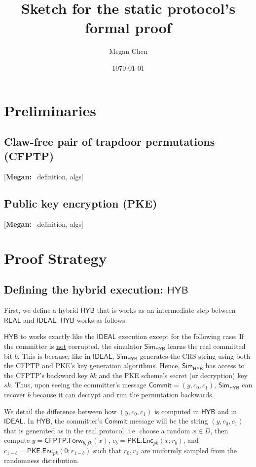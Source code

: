 \documentclass{article}[12pt]
\title{Sketch for the \cite{CanettiF01} static protocol's formal proof}
\author{Megan Chen}
\date{\today}
\newcommand{\authnote}[2]{[{\color{red}\textbf{#1:}}~{\color{blue} #2}]}
\newcommand{\authnote}[2]{}
\newcommand{\megan}[1]{\authnote{Megan}{#1}}
\newcommand{\CommitMsg}{\mathsf{Commit}}
\newcommand{\PKE}{\mathsf{PKE}}
\newcommand{\Enc}{\mathsf{Enc}}
\newcommand{\EncKey}{{pk}}
\newcommand{\DecKey}{{sk}}
\newcommand{\CFPTP}{\mathsf{CFPTP}}
\newcommand{\Forw}{\mathsf{Forw}}
\newcommand{\ForwKey}{{fk}}
\newcommand{\BackKey}{{bk}}
\newcommand{\Simulator}{{\mathsf{Sim}}} %
\newcommand{\Ideal}{{\mathsf{IDEAL}}}
\newcommand{\Hyb}{{\mathsf{HYB}}}
\newcommand{\Real}{{\mathsf{REAL}}}
\begin{document}
\maketitle
\tableofcontents

\section{Preliminaries}

\subsection{Claw-free pair of trapdoor permutations (CFPTP)}
\megan{definition, algs}

\subsection{Public key encryption (PKE)}
\megan{definition, algs}

\section{Proof Strategy}

\subsection{Defining the hybrid execution: $\Hyb$}
First, we define a hybrid $\Hyb$ that is works as an intermediate step between $\Real$ and $\Ideal$. $\Hyb$ works as follows:

$\Hyb$ to works exactly like the $\Ideal$ execution except for the following case: If the committer is \underline{not} corrupted, the simulator $\Simulator_{\Hyb}$ learns the real committed bit $b$. This is because, like in $\Ideal$, $\Simulator_{\Hyb}$ generates the CRS string using both the CFPTP and PKE's key generation algorithms. Hence, $\Simulator_{\Hyb}$ has access to the CFPTP's backward key $\BackKey$ and the PKE scheme's secret (or decryption) key $\DecKey$. Thus, upon seeing the committer's message $\CommitMsg = (y, c_0, c_1)$, $\Simulator_{\Hyb}$ can recover $b$ because it can decrypt and run the permutation backwards.

We detail the difference between how $(y, c_0, c_1)$ is computed in $\Hyb$ and in $\Ideal$. In $\Hyb$, the committer's $\CommitMsg$ message will be the string $(y, c_0, c_1)$ that is generated as in the real protocol, i.e. choose a random $x \in D$, then compute $y = \CFPTP.\Forw_{b, \ForwKey}(x)$, $c_b = \PKE.\Enc_\EncKey(x; r_b)$, and $c_{1-b} = \PKE.\Enc_\EncKey(0; r_{1-b})$ such that $r_0, r_1$ are uniformly sampled from the randomness distribution.
\end{document}
